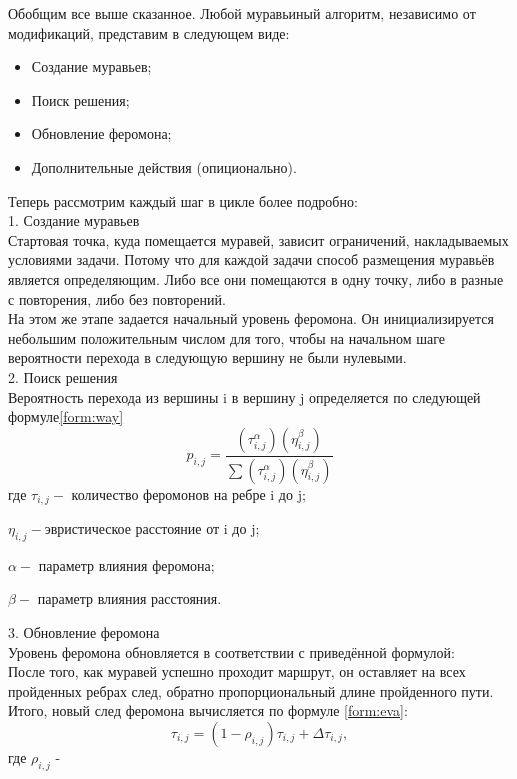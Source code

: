 \documentclass[12pt]{report}
\begin{document}
Обобщим все выше сказанное. Любой муравьиный алгоритм, независимо от модификаций, представим в следующем виде:
\begin{itemize}
	\item Создание муравьев;
	\item Поиск решения;
	\item Обновление феромона;
	\item Дополнительные действия (опиционально).
\end{itemize}

Теперь рассмотрим каждый шаг в цикле более подробно:\\

1. Создание муравьев\\
Стартовая точка, куда помещается муравей, зависит ограничений,   накладываемых условиями задачи. Потому что для каждой задачи   способ размещения муравьёв является определяющим. Либо все    они помещаются в одну точку, либо в разные с повторения, либо    без повторений. \\
На этом же этапе задается начальный уровень феромона. Он    инициализируется небольшим положительным числом для того,    чтобы на начальном шаге вероятности перехода в следующую    вершину не были нулевыми. \\

2. Поиск решения  \\
Вероятность перехода из вершины i в вершину j определяется по следующей формуле\ref{form:way}\\   
\begin{equation}\label{form:way} 
p_{i,j}={\frac {(\tau _{i,j}^{\alpha })(\eta _{i,j}^{\beta })}{\sum (\tau _{i,j}^{\alpha })(\eta _{i,j}^{\beta })}}
\end{equation}
где \quad$ \tau _{i,j} - $ количество феромонов на ребре i до j;

$\eta _{i,j} - $эвристическое расстояние от i до j;

$\alpha - $ параметр влияния феромона;

$\beta - $ параметр влияния расстояния.


3. Обновление феромона \\
Уровень феромона обновляется в соответствии с приведённой формулой:\\
После того, как муравей успешно проходит маршрут, он оставляет на всех пройденных ребрах след, обратно пропорциональный длине пройденного пути. Итого, новый след феромона вычисляется по формуле \ref{form:eva}:
\begin{equation}\label{form:eva} 
\tau _{i,j}=(1-\rho_{i,j} )\tau _{i,j}+\Delta \tau _{i,j},
\end{equation}
где \quad$ \rho _{i,j}$ -  
\end{document}
